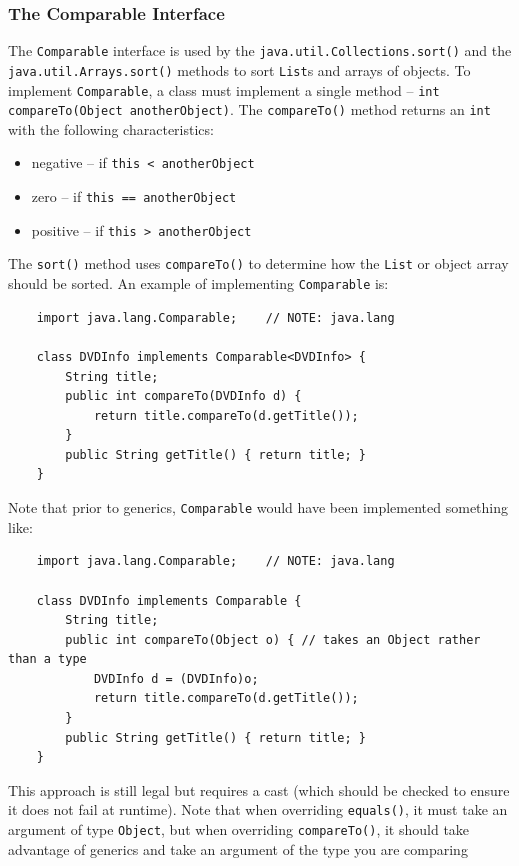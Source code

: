 \subsubsection{The Comparable Interface}
The \verb#Comparable# interface is used by the 
\verb#java.util.Collections.sort()# and the \verb#java.util.Arrays.sort()# 
methods to sort \verb#List#s and arrays of objects. To implement 
\verb#Comparable#, a class must implement a single method --
\verb#int compareTo(Object anotherObject)#. The \verb#compareTo()# method 
returns an \verb#int# with the following characteristics:
\begin{itemize}
    \item negative -- if \verb#this < anotherObject#
    \item zero -- if \verb#this == anotherObject#
    \item positive -- if \verb#this > anotherObject#
\end{itemize}
The \verb#sort()# method uses \verb#compareTo()# to determine how the 
\verb#List# or object array should be sorted. An example of implementing 
\verb#Comparable# is:
\begin{verbatim}
    import java.lang.Comparable;    // NOTE: java.lang

    class DVDInfo implements Comparable<DVDInfo> {
        String title;
        public int compareTo(DVDInfo d) {
            return title.compareTo(d.getTitle());
        }
        public String getTitle() { return title; }
    }
\end{verbatim}
Note that prior to generics, \verb#Comparable# would have been implemented 
something like:
\begin{verbatim}
    import java.lang.Comparable;    // NOTE: java.lang

    class DVDInfo implements Comparable {
        String title;
        public int compareTo(Object o) { // takes an Object rather than a type
            DVDInfo d = (DVDInfo)o;
            return title.compareTo(d.getTitle());
        }
        public String getTitle() { return title; }
    }
\end{verbatim}
This approach is still legal but requires a cast (which should be checked to 
ensure it does not fail at runtime). Note that when overriding \verb#equals()#,
it must take an argument of type \verb#Object#, but when overriding 
\verb#compareTo()#, it should take advantage of generics and take an argument 
of the type you are comparing

